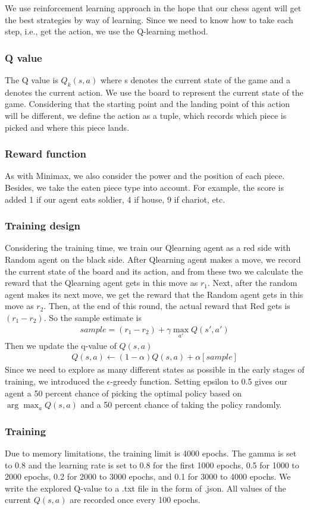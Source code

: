 We use reinforcement learning approach in the hope that our chess agent will get the best strategies by way of learning. 
Since we need to know how to take each step, i.e., get the action, we use the Q-learning method.
\subsubsection{Q value}
The Q value is $Q_{k}(s,a)$
where s denotes the current state of the game and a denotes the current action.
We use the board to represent the current state of the game. Considering that the 
starting point and the landing point of this action will be different, we define the 
action as a tuple, which records which piece is picked and where this piece lands.
\subsubsection{Reward function}
As with Minimax, we also consider the power and the position of each piece. Besides, we take the eaten piece type into account.
For example, the score is added 1 if our agent eats soldier, 4 if house, 9 if chariot, etc.

\subsubsection{Training design}
Considering the training time, we train our Qlearning agent as a red side with Random agent on the black side. 
After Qlearning agent makes a move, we record the current state of the board and its 
action, and from these two we calculate the reward that the Qlearning agent gets in this move 
as $r_1$. Next, after the random agent makes its next move, we get the reward
that the Random agent gets in this move as $r_2$. Then, at the end of this round, the actual
reward that Red gets is $(r_1-r_2)$. So the sample estimate is
\begin{align*}
    sample=(r_1-r_2)+\gamma\max_{a'}Q(s',a')
\end{align*}
Then we update the q-value of $Q(s,a)$
\begin{align*}
    Q(s,a)\leftarrow (1-\alpha)Q(s,a)+\alpha [sample]
\end{align*}
Since we need to explore as many different states as possible in the early stages of training, 
we introduced the $\epsilon$-greedy function. Setting epsilon to 0.5 gives our agent a 50 percent chance of
picking the optimal policy based on $\arg\max_{a}Q(s,a)$ and a 50 percent chance of taking the policy randomly.

\subsubsection{Training}
Due to memory limitations, the training limit is 4000 epochs. The gamma is set to 0.8 and the 
learning rate is set to 0.8 for the first 1000 epochs, 0.5 for 1000 to 2000 epochs, 0.2 for 2000 
to 3000 epochs, and 0.1 for 3000 to 4000 epochs.
We write the explored Q-value to a .txt file in the form of .json. All values of the current $Q(s,a)$ are
recorded once every 100 epochs.